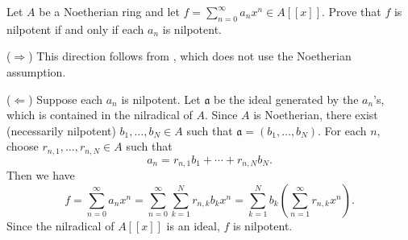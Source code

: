 \begin{exercise}
Let \(A\) be a Noetherian ring and let \(f = \sum_{n=0}^\infty a_n x^n \in A[[x]]\).
Prove that \(f\) is nilpotent if and only if each \(a_n\) is nilpotent.
\end{exercise}

\begin{solution}
(\(\Rightarrow\)) This direction follows from , which does not use the Noetherian assumption.

(\(\Leftarrow\))
Suppose each \(a_n\) is nilpotent.
Let \(\mathfrak{a}\) be the ideal generated by the \(a_n\)'s, which is contained in the nilradical of \(A\).
Since \(A\) is Noetherian, there exist (necessarily nilpotent) \(b_1, \ldots, b_N \in A\) such that \(\mathfrak{a} = (b_1, \ldots, b_N)\).
For each \(n\), choose \(r_{n, 1}, \ldots, r_{n, N} \in A\) such that
\begin{equation*}
a_n = r_{n, 1} b_1 + \cdots + r_{n, N} b_N.
\end{equation*}
Then we have
\begin{equation*}
f = \sum_{n=0}^\infty a_n x^n
= \sum_{n=0}^\infty \sum_{k=1}^N r_{n, k} b_k x^n
= \sum_{k=1}^N b_k \left(\sum_{n=1}^\infty r_{n, k} x^n\right).
\end{equation*}
Since the nilradical of \(A[[x]]\) is an ideal, \(f\) is nilpotent.
\end{solution}